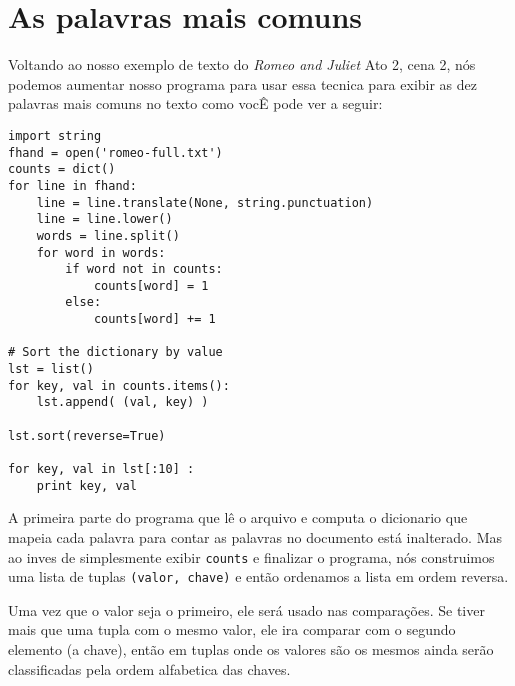 \section{As palavras mais comuns}

Voltando ao nosso exemplo de texto do \emph{Romeo and Juliet}
Ato 2, cena 2, nós podemos aumentar nosso programa para usar essa tecnica
para exibir as dez palavras mais comuns no texto como vocÊ pode ver a seguir:

\beforeverb
\begin{verbatim}
import string
fhand = open('romeo-full.txt')
counts = dict()
for line in fhand:
    line = line.translate(None, string.punctuation)
    line = line.lower()
    words = line.split()
    for word in words:
        if word not in counts:
            counts[word] = 1
        else:
            counts[word] += 1

# Sort the dictionary by value
lst = list()
for key, val in counts.items():
    lst.append( (val, key) )

lst.sort(reverse=True)

for key, val in lst[:10] :
    print key, val
\end{verbatim}
\afterverb
%
A primeira parte do programa que lê o arquivo e computa o dicionario
que mapeia cada palavra para contar as palavras no documento está
inalterado. Mas ao inves de simplesmente exibir {\tt counts} e 
finalizar o programa, nós construimos uma lista de tuplas 
{\tt (valor, chave)} e então ordenamos a lista em ordem reversa.

Uma vez que o valor seja o primeiro, ele será usado nas comparações.
Se tiver mais que uma tupla com o mesmo valor, ele ira comparar
com o segundo elemento (a chave), então em tuplas onde os valores são
os mesmos ainda serão classificadas pela ordem alfabetica das chaves.

